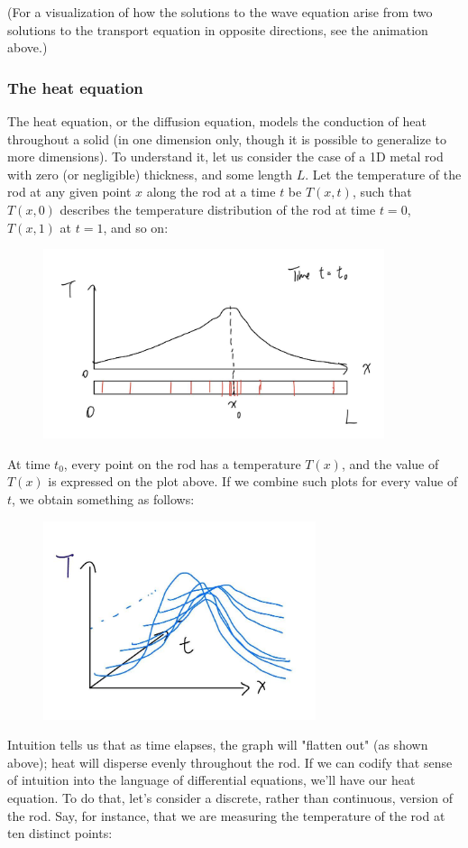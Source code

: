 \documentclass{article}
\begin{document}
(For a visualization of how the solutions to the wave equation arise from two solutions to the transport equation in opposite directions, see the animation above.)
\subsubsection{The heat equation}
The heat equation, or the diffusion equation, models the conduction of heat throughout a solid (in one dimension only, though it is possible to generalize to more dimensions). To understand it, let us consider the case of a 1D metal rod with zero (or negligible) thickness, and some length $L$. Let the temperature of the rod at any given point $x$ along the rod at a time $t$ be $T(x,t)$, such that $T(x,0)$ describes the temperature distribution of the rod at time $t=0$, $T(x,1)$ at $t=1$, and so on:
\begin{figure}[h]
    \centering
    \includegraphics[width=10cm]{DE-ch4-heat1.jpg}
\end{figure}
At time $t_0$, every point on the rod has a temperature $T(x)$, and the value of $T(x)$ is expressed on the plot above. If we combine such plots for every value of $t$, we obtain something as follows:
\begin{figure}[h]
    \centering
    \includegraphics[width=8cm]{DE-ch4-heat2.jpg}
\end{figure}
Intuition tells us that as time elapses, the graph will "flatten out" (as shown above); heat will disperse evenly throughout the rod. If we can codify that sense of intuition into the language of differential equations, we'll have our heat equation. To do that, let's consider a discrete, rather than continuous, version of the rod. Say, for instance, that we are measuring the temperature of the rod at ten distinct points:
\end{document}
